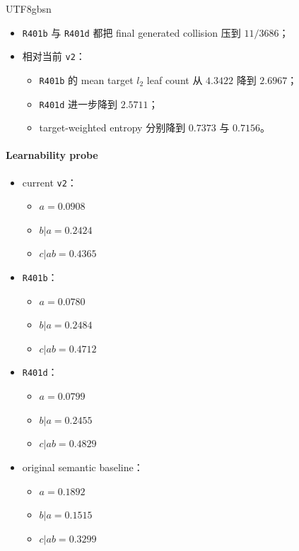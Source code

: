 \documentclass[11pt]{article}
\begin{document}
\begin{CJK*}{UTF8}{gbsn}
\begin{itemize}
  \item \texttt{R401b} 与 \texttt{R401d} 都把 final generated collision 压到 \(11/3686\)；
  \item 相对当前 \texttt{v2}：
  \begin{itemize}
    \item \texttt{R401b} 的 mean target \(l_2\) leaf count 从 \(4.3422\) 降到 \(2.6967\)；
    \item \texttt{R401d} 进一步降到 \(2.5711\)；
    \item target-weighted entropy 分别降到 \(0.7373\) 与 \(0.7156\)。
  \end{itemize}
\end{itemize}

\paragraph{Learnability probe}

\begin{itemize}
  \item current \texttt{v2}：
  \begin{itemize}
    \item \(a = 0.0908\)
    \item \(b|a = 0.2424\)
    \item \(c|ab = 0.4365\)
  \end{itemize}
  \item \texttt{R401b}：
  \begin{itemize}
    \item \(a = 0.0780\)
    \item \(b|a = 0.2484\)
    \item \(c|ab = 0.4712\)
  \end{itemize}
  \item \texttt{R401d}：
  \begin{itemize}
    \item \(a = 0.0799\)
    \item \(b|a = 0.2455\)
    \item \(c|ab = 0.4829\)
  \end{itemize}
  \item original semantic baseline：
  \begin{itemize}
    \item \(a = 0.1892\)
    \item \(b|a = 0.1515\)
    \item \(c|ab = 0.3299\)
  \end{itemize}
\end{itemize}


\end{CJK*}
\end{document}
